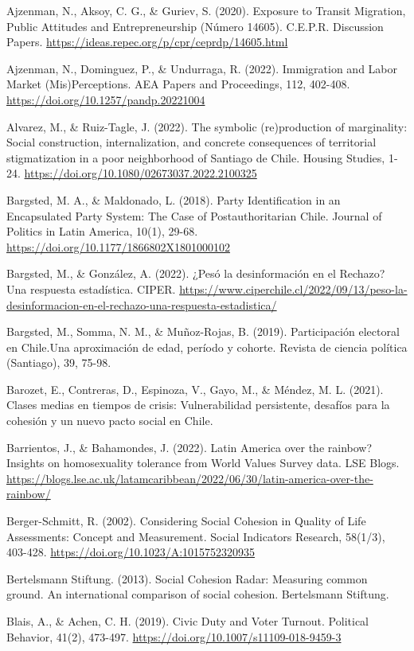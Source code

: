 \documentclass[
  12pt,
]{book}
\begin{document}
Ajzenman, N., Aksoy, C. G., \& Guriev, S. (2020). Exposure to Transit Migration, Public Attitudes and Entrepreneurship (Número 14605). C.E.P.R. Discussion Papers. \url{https://ideas.repec.org/p/cpr/ceprdp/14605.html}

Ajzenman, N., Dominguez, P., \& Undurraga, R. (2022). Immigration and Labor Market (Mis)Perceptions. AEA Papers and Proceedings, 112, 402-408. \url{https://doi.org/10.1257/pandp.20221004}

Alvarez, M., \& Ruiz-Tagle, J. (2022). The symbolic (re)production of marginality: Social construction, internalization, and concrete consequences of territorial stigmatization in a poor neighborhood of Santiago de Chile. Housing Studies, 1-24. \url{https://doi.org/10.1080/02673037.2022.2100325}

Bargsted, M. A., \& Maldonado, L. (2018). Party Identification in an Encapsulated Party System: The Case of Postauthoritarian Chile. Journal of Politics in Latin America, 10(1), 29-68. \url{https://doi.org/10.1177/1866802X1801000102}

Bargsted, M., \& González, A. (2022). ¿Pesó la desinformación en el Rechazo? Una respuesta estadística. CIPER. \url{https://www.ciperchile.cl/2022/09/13/peso-la-desinformacion-en-el-rechazo-una-respuesta-estadistica/}

Bargsted, M., Somma, N. M., \& Muñoz-Rojas, B. (2019). Participación electoral en Chile.Una aproximación de edad, período y cohorte. Revista de ciencia política (Santiago), 39, 75-98.

Barozet, E., Contreras, D., Espinoza, V., Gayo, M., \& Méndez, M. L. (2021). Clases medias en tiempos de crisis: Vulnerabilidad persistente, desafíos para la cohesión y un nuevo pacto social en Chile.

Barrientos, J., \& Bahamondes, J. (2022). Latin America over the rainbow? Insights on homosexuality tolerance from World Values Survey data. LSE Blogs. \url{https://blogs.lse.ac.uk/latamcaribbean/2022/06/30/latin-america-over-the-rainbow/}

Berger-Schmitt, R. (2002). Considering Social Cohesion in Quality of Life Assessments: Concept and Measurement. Social Indicators Research, 58(1/3), 403-428. \url{https://doi.org/10.1023/A:1015752320935}

Bertelsmann Stiftung. (2013). Social Cohesion Radar: Measuring common ground. An international comparison of social cohesion. Bertelsmann Stiftung.

Blais, A., \& Achen, C. H. (2019). Civic Duty and Voter Turnout. Political Behavior, 41(2), 473-497. \url{https://doi.org/10.1007/s11109-018-9459-3}
\end{document}
